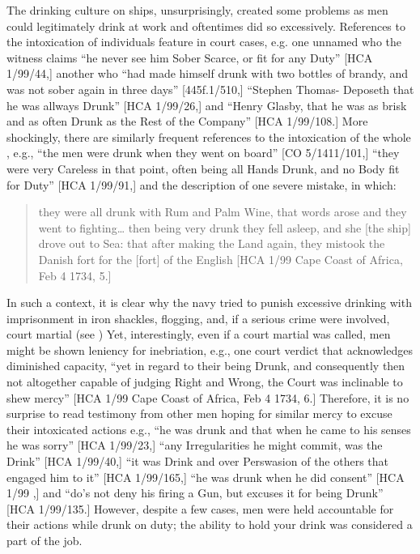 The drinking culture on ships, unsurprisingly, created some problems as men could legitimately drink at work and oftentimes did so excessively. References to the intoxication of individuals feature in court cases, e.g. one unnamed  who the witness claims “he never see him Sober Scarce, or fit for any Duty” [HCA 1/99/44,] another who “had made himself drunk with two bottles of brandy, and was not sober again in three days” [445f.1/510,] “Stephen Thomas- Deposeth that he was allways Drunk” [HCA 1/99/26,] and “Henry Glasby, that he was as brisk and as often Drunk as the Rest of the Company” [HCA 1/99/108.] More shockingly, there are similarly frequent references to the intoxication of the whole , e.g., “the men were drunk when they went on board” [CO 5/1411/101,] “they were very Careless in that point, often being all Hands Drunk, and no Body fit for Duty” [HCA 1/99/91,] and the description of one severe mistake, in which: 

\begin{quotation}
they were all drunk with Rum and Palm Wine, that words arose and they went to fighting… then being very drunk they fell asleep, and she [the ship] drove out to Sea: that after making the Land again, they mistook the Danish fort for the [fort] of the English [HCA 1/99 Cape Coast of Africa, Feb 4 1734, 5.]
\end{quotation}

In such a context, it is clear why the navy tried to punish excessive drinking with imprisonment in iron shackles, flogging, and, if a serious crime were involved, court martial (see ) Yet, interestingly, even if a court martial was called, men might be shown leniency for inebriation, e.g., one court verdict that acknowledges diminished capacity, “yet in regard to their being Drunk, and consequently then not altogether capable of judging Right and Wrong, the Court was inclinable to shew mercy” [HCA 1/99 Cape Coast of Africa, Feb 4 1734, 6.] Therefore, it is no surprise to read testimony from other men hoping for similar mercy to excuse their intoxicated actions e.g., “he was drunk and that when he came to his senses he was sorry” [HCA 1/99/23,] “any Irregularities he might commit, was the Drink” [HCA 1/99/40,] “it was Drink and over Perswasion of the others that engaged him to it” [HCA 1/99/165,] “he was drunk when he did consent” [HCA 1/99  \citealt{Islands1722},] and “do’s not deny his firing a Gun, but excuses it for being Drunk” [HCA 1/99/135.] However, despite a few cases, men were held accountable for their actions while drunk on duty; the ability to hold your drink was considered a part of the job. 


